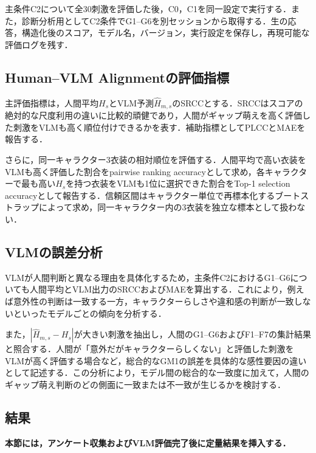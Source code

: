 \documentclass[a4j,twocolumn,11pt]{jarticle}
\begin{document}
主条件C2について全30刺激を評価した後，C0，C1を同一設定で実行する．また，診断分析用としてC2条件でG1--G6を別セッションから取得する．生の応答，構造化後のスコア，モデル名，バージョン，実行設定を保存し，再現可能な評価ログを残す．

\subsection{Human--VLM Alignmentの評価指標}
主評価指標は，人間平均$H_s$とVLM予測$\hat{H}_{m,s}$のSRCCとする．SRCCはスコアの絶対的な尺度利用の違いに比較的頑健であり，人間がギャップ萌えを高く評価した刺激をVLMも高く順位付けできるかを表す．補助指標としてPLCCとMAEを報告する．

さらに，同一キャラクター3衣装の相対順位を評価する．人間平均で高い衣装をVLMも高く評価した割合をpairwise ranking accuracyとして求め，各キャラクターで最も高い$H_s$を持つ衣装をVLMも1位に選択できた割合をTop-1 selection accuracyとして報告する．信頼区間はキャラクター単位で再標本化するブートストラップによって求め，同一キャラクター内の3衣装を独立な標本として扱わない．

\subsection{VLMの誤差分析}
VLMが人間判断と異なる理由を具体化するため，主条件C2におけるG1--G6についても人間平均とVLM出力のSRCCおよびMAEを算出する．これにより，例えば意外性の判断は一致する一方，キャラクターらしさや違和感の判断が一致しないといったモデルごとの傾向を分析する．

また，$|\hat{H}_{m,s}-H_s|$が大きい刺激を抽出し，人間のG1--G6およびF1--F7の集計結果と照合する．人間が「意外だがキャラクターらしくない」と評価した刺激をVLMが高く評価する場合など，総合的なGM1の誤差を具体的な感性要因の違いとして記述する．この分析により，モデル間の総合的な一致度に加えて，人間のギャップ萌え判断のどの側面に一致または不一致が生じるかを検討する．

\subsection{結果}
\textbf{本節には，アンケート収集およびVLM評価完了後に定量結果を挿入する．}
\end{document}
